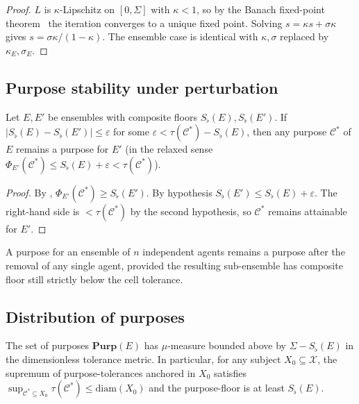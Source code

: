 \documentclass[11pt,a4paper]{article}
\newcommand{\X}{\mathcal{X}}
\newcommand{\Cell}{\mathcal{C}}
\newcommand{\Sfloor}{S_{\flat}}
\newcommand{\eps}{\varepsilon}
\newcommand{\diam}{\mathrm{diam}}
\begin{document}
\begin{proof}
$L$ is $\kappa$-Lipschitz on $[0,\Sigma]$ with $\kappa<1$, so by the
Banach fixed-point theorem~\cite{banach1922} the iteration converges
to a unique fixed point. Solving $s=\kappa s+\sigma\kappa$ gives
$s=\sigma\kappa/(1-\kappa)$. The ensemble case is identical with
$\kappa,\sigma$ replaced by $\kappa_E,\sigma_E$.
\end{proof}

\subsection{Purpose stability under perturbation}

\begin{theorem}\label{thm:purp-stab}
Let $E,E'$ be ensembles with composite floors
$\Sfloor(E),\Sfloor(E')$. If
$|\Sfloor(E)-\Sfloor(E')|\le\eps$ for some $\eps<\tau(\Cell^*)
-\Sfloor(E)$, then any purpose $\Cell^*$ of $E$ remains a purpose for
$E'$ (in the relaxed sense $\Phi_{E'}(\Cell^*)\le\Sfloor(E)+\eps<
\tau(\Cell^*)$).
\end{theorem}

\begin{proof}
By , $\Phi_{E'}(\Cell^*)\ge\Sfloor(E')$. By
hypothesis $\Sfloor(E')\le\Sfloor(E)+\eps$. The right-hand side is
$<\tau(\Cell^*)$ by the second hypothesis, so $\Cell^*$ remains
attainable for $E'$.
\end{proof}

\begin{corollary}\label{cor:dropout}
A purpose for an ensemble of $n$ independent agents remains a purpose
after the removal of any single agent, provided the resulting
sub-ensemble has composite floor still strictly below the cell
tolerance.
\end{corollary}

\subsection{Distribution of purposes}

\begin{theorem}\label{thm:purp-dist}
The set of purposes $\mathbf{Purp}(E)$ has $\mu$-measure bounded above
by $\Sigma-\Sfloor(E)$ in the dimensionless tolerance metric. In
particular, for any subject $X_0\subseteq\X$, the supremum of
purpose-tolerances anchored in $X_0$ satisfies
$\sup_{\Cell^*\subseteq X_0}\tau(\Cell^*)\le\diam(X_0)$ and the
purpose-floor is at least $\Sfloor(E)$.
\end{theorem}
\end{document}
